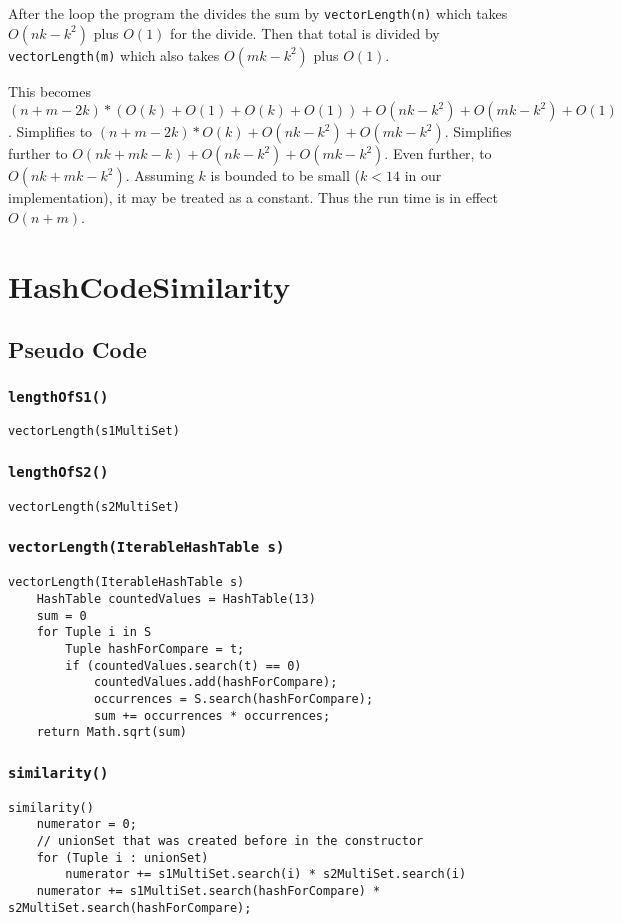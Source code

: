 \documentclass[10pt,letterpaper]{article}
\begin{document}
After the loop the program the divides the sum by \texttt{vectorLength(n)} which takes $O(nk-k^2)$ plus $O(1)$ for the divide. Then that total is divided by \texttt{vectorLength(m)} which also takes $O(mk-k^2)$ plus $O(1)$.

This becomes $(n+m-2k)*(O(k)+O(1)+O(k)+O(1))+O(nk-k^2)+O(mk-k^2)+O(1)$. Simplifies to $(n+m-2k)*O(k)+O(nk-k^2)+O(mk-k^2)$. Simplifies further to $O(nk+mk-k)+O(nk-k^2)+O(mk-k^2)$. Even further, to $O(nk+mk-k^2)$. Assuming $k$ is bounded to be small ($k<14$ in our implementation), it may be treated as a constant. Thus the run time is in effect $O(n+m)$.
\section{HashCodeSimilarity}
\subsection{Pseudo Code}
\subsubsection{\texttt{lengthOfS1()}}
\begin{verbatim}
vectorLength(s1MultiSet)
\end{verbatim}
\subsubsection{\texttt{lengthOfS2()}}
\begin{verbatim}
vectorLength(s2MultiSet)
\end{verbatim}
\subsubsection{\texttt{vectorLength(IterableHashTable s)}}
\begin{verbatim}
vectorLength(IterableHashTable s)
    HashTable countedValues = HashTable(13)
    sum = 0
    for Tuple i in S
        Tuple hashForCompare = t;
        if (countedValues.search(t) == 0)
            countedValues.add(hashForCompare);
            occurrences = S.search(hashForCompare);
            sum += occurrences * occurrences;
    return Math.sqrt(sum)
\end{verbatim}
\subsubsection{\texttt{similarity()}}
\begin{verbatim}
similarity()
    numerator = 0;
    // unionSet that was created before in the constructor
    for (Tuple i : unionSet)
        numerator += s1MultiSet.search(i) * s2MultiSet.search(i)
    numerator += s1MultiSet.search(hashForCompare) * s2MultiSet.search(hashForCompare);
\end{verbatim}
\end{document}
